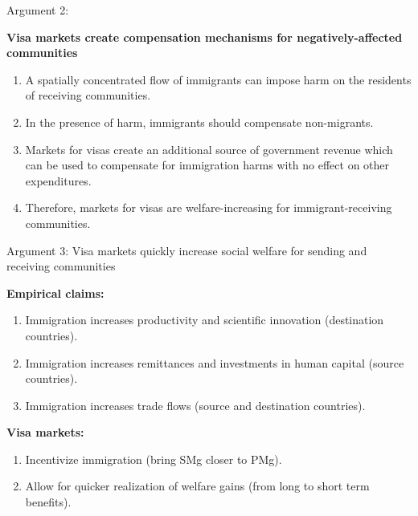 \documentclass[10pt,ignorenonframetext,]{beamer}
\begin{document}
\begin{frame}{Argument 2:}
\protect\hypertarget{arg2}{}

\textbf{Visa markets create compensation mechanisms for
negatively-affected communities}

\begin{enumerate}
\item
  A spatially concentrated flow of immigrants can impose harm on the
  residents of receiving communities.\\
\item
  In the presence of harm, immigrants should compensate non-migrants.\\
\item
  Markets for visas create an additional source of government revenue
  which can be used to compensate for immigration harms with no effect
  on other expenditures.\\
\item
  Therefore, markets for visas are welfare-increasing for
  immigrant-receiving communities.
\end{enumerate}

\end{frame}

\begin{frame}{Argument 3: Visa markets quickly increase social welfare
for sending and receiving communities}
\protect\hypertarget{arg3}{}

\textbf{Empirical claims:}

\begin{enumerate}
\item
  Immigration increases productivity and scientific innovation
  (destination countries).\\
\item
  Immigration increases remittances and investments in human capital
  (source countries).\\
\item
  Immigration increases trade flows (source and destination
  countries).\\
\end{enumerate}

\textbf{Visa markets:}

\begin{enumerate}
\item
  Incentivize immigration (bring SMg closer to PMg).\\
\item
  Allow for quicker realization of welfare gains (from long to short
  term benefits).
\end{enumerate}

\end{frame}
\end{document}
